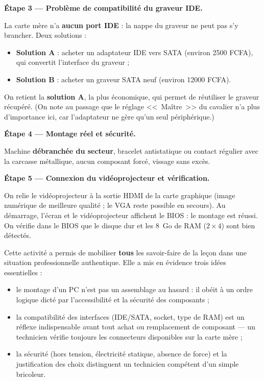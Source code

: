 \documentclass[11pt]{article}
\newcommand{\cle}[1]{{\popxbold\color{popdark}#1}}
\newcounter{popsec}
\newcounter{popsub}
\newcommand{\courssub}[1]{%
  \stepcounter{popsub}%
  \par\vspace{9pt}\noindent{\popxbold\fontsize{11.5}{13}\selectfont\color{popink}{\color{poporange}\thepopsec.\thepopsub}\hspace{6pt}#1}\par\nopagebreak\vspace{4pt}
}
\begin{document}
\begin{exoresolu}
\textbf{Étape 3 — Problème de compatibilité du graveur IDE.}

La carte mère n'a \textbf{aucun port IDE} : la nappe du graveur ne peut pas s'y brancher. Deux solutions :
\begin{itemize}
  \item \textbf{Solution A} : acheter un \cle{adaptateur IDE vers SATA} (environ \num{2500} FCFA), qui convertit l'interface du graveur ;
  \item \textbf{Solution B} : acheter un graveur SATA neuf (environ \num{12000} FCFA).
\end{itemize}
On retient la \textbf{solution A}, la plus économique, qui permet de réutiliser le graveur récupéré. (On note au passage que le réglage <<~Maître~>> du cavalier n'a plus d'importance ici, car l'adaptateur ne gère qu'un seul périphérique.)

\textbf{Étape 4 — Montage réel et sécurité.}

Machine \textbf{débranchée du secteur}, bracelet antistatique ou contact régulier avec la carcasse métallique, aucun composant forcé, vissage sans excès.

\textbf{Étape 5 — Connexion du vidéoprojecteur et vérification.}

On relie le vidéoprojecteur à la sortie \cle{HDMI} de la carte graphique (image numérique de meilleure qualité ; le VGA reste possible en secours). Au démarrage, l'écran et le vidéoprojecteur affichent le BIOS : le montage est réussi. On vérifie dans le BIOS que le disque dur et les \SI{8}{Go} de RAM ($2 \times 4$) sont bien détectés.
\end{exoresolu}

\courssub{Bilan de l'activité}

Cette activité a permis de mobiliser \textbf{tous} les savoir-faire de la leçon dans une situation professionnelle authentique. Elle a mis en évidence trois idées essentielles :

\begin{itemize}
  \item le montage d'un PC n'est pas un assemblage au hasard : il obéit à un \cle{ordre logique} dicté par l'accessibilité et la sécurité des composants ;
  \item la \cle{compatibilité des interfaces} (IDE/SATA, socket, type de RAM) est un réflexe indispensable avant tout achat ou remplacement de composant — un technicien vérifie toujours les connecteurs disponibles sur la carte mère ;
  \item la \cle{sécurité} (hors tension, électricité statique, absence de force) et la \cle{justification des choix} distinguent un technicien compétent d'un simple bricoleur.
\end{itemize}
\end{document}
